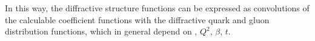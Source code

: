 In this way, the diffractive structure functions can be expressed as convolutions of the
calculable coefficient functions with the diffractive quark and gluon distribution functions,
 which in general depend on \xpom, $Q^2$, $\beta$, $t$.

%




